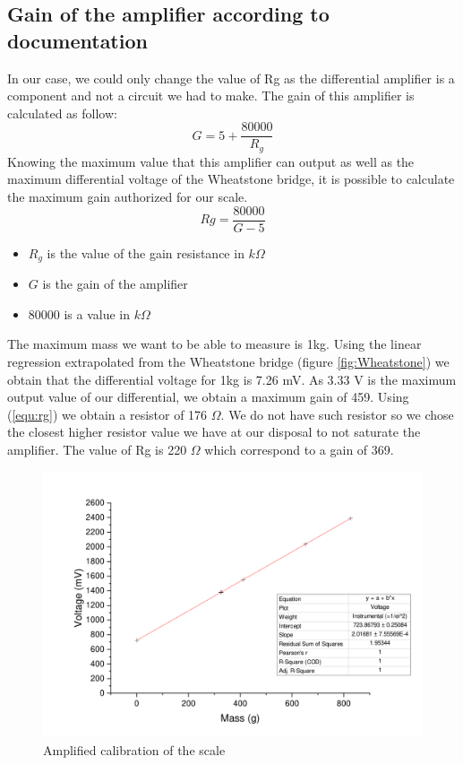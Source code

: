 \documentclass{article}[12pt]
\begin{document}
\subsection{Gain of the amplifier according to documentation}
In our case, we could only change the value of Rg as the differential amplifier is a component and not a circuit we had to make. The gain of this amplifier is calculated as follow:
\begin{equation}
    G=5+\dfrac{80000}{R_g}
\end{equation}
Knowing the maximum value that this amplifier can output as well as the maximum differential voltage of the Wheatstone bridge, it is possible to calculate the maximum gain authorized for our scale.
\begin{equation}
    Rg= \dfrac{80000}{G-5}
    \label{equ:rg}
\end{equation}
\begin{itemize}
    \item $R_g$ is the value of the gain resistance in $k\Omega$
    \item $G$ is the gain of the amplifier
    \item $80000$ is a value in $k\Omega$
\end{itemize}
The maximum mass we want to be able to measure is 1kg.
Using the linear regression extrapolated from the Wheatstone bridge (figure \ref{fig:Wheatstone}) we obtain that the differential voltage for 1kg is 7.26 mV.
As 3.33 V is the maximum output value of our differential, we obtain a maximum gain of 459.
Using (\ref{equ:rg}) we obtain a resistor of 176 $\Omega$. We do not have such resistor so we chose the closest higher resistor value we have at our disposal to not saturate the amplifier.
The value of Rg is 220 $\Omega$ which correspond to a gain of 369.
\begin{figure}[H]
    \centering
    \includegraphics[width=.6\textwidth]{figures/offset_not_compensated.pdf}
    \caption{Amplified calibration of the scale}
    \label{fig:offset_not_compensated}
\end{figure}
\end{document}
